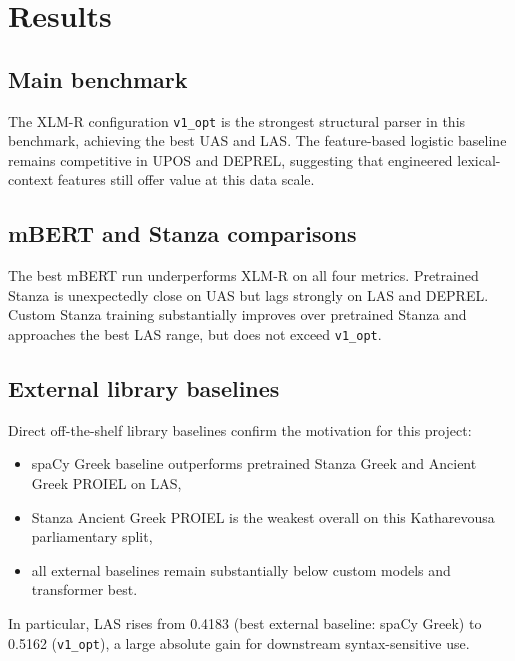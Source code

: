 \section{Results}



\subsection{Main benchmark}







The XLM-R configuration \texttt{v1\_opt} is the strongest structural parser in this benchmark, achieving the best UAS and LAS. The feature-based logistic baseline remains competitive in UPOS and DEPREL, suggesting that engineered lexical-context features still offer value at this data scale.



\subsection{mBERT and Stanza comparisons}



The best mBERT run underperforms XLM-R on all four metrics. Pretrained Stanza is unexpectedly close on UAS but lags strongly on LAS and DEPREL. Custom Stanza training substantially improves over pretrained Stanza and approaches the best LAS range, but does not exceed \texttt{v1\_opt}.



\subsection{External library baselines}



Direct off-the-shelf library baselines confirm the motivation for this project:

\begin{itemize}[leftmargin=1.25em]

  \item spaCy Greek baseline outperforms pretrained Stanza Greek and Ancient Greek PROIEL on LAS,

  \item Stanza Ancient Greek PROIEL is the weakest overall on this Katharevousa parliamentary split,

  \item all external baselines remain substantially below custom models and transformer best.

\end{itemize}



In particular, LAS rises from 0.4183 (best external baseline: spaCy Greek) to 0.5162 (\texttt{v1\_opt}), a large absolute gain for downstream syntax-sensitive use.

